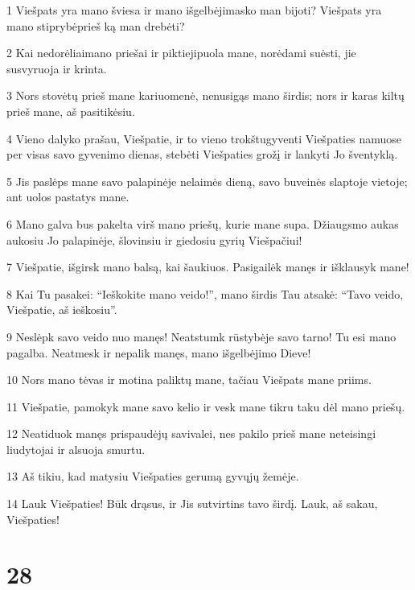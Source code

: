 \par 1 Viešpats yra mano šviesa ir mano išgelbėjimas­ko man bijoti? Viešpats yra mano stiprybė­prieš ką man drebėti? 
\par 2 Kai nedorėliai­mano priešai ir piktieji­puola mane, norėdami suėsti, jie susvyruoja ir krinta. 
\par 3 Nors stovėtų prieš mane kariuomenė, nenusigąs mano širdis; nors ir karas kiltų prieš mane, aš pasitikėsiu. 
\par 4 Vieno dalyko prašau, Viešpatie, ir to vieno trokštu­gyventi Viešpaties namuose per visas savo gyvenimo dienas, stebėti Viešpaties grožį ir lankyti Jo šventyklą. 
\par 5 Jis paslėps mane savo palapinėje nelaimės dieną, savo buveinės slaptoje vietoje; ant uolos pastatys mane. 
\par 6 Mano galva bus pakelta virš mano priešų, kurie mane supa. Džiaugsmo aukas aukosiu Jo palapinėje, šlovinsiu ir giedosiu gyrių Viešpačiui! 
\par 7 Viešpatie, išgirsk mano balsą, kai šaukiuos. Pasigailėk manęs ir išklausyk mane! 
\par 8 Kai Tu pasakei: “Ieškokite mano veido!”, mano širdis Tau atsakė: “Tavo veido, Viešpatie, aš ieškosiu”. 
\par 9 Neslėpk savo veido nuo manęs! Neatstumk rūstybėje savo tarno! Tu esi mano pagalba. Neatmesk ir nepalik manęs, mano išgelbėjimo Dieve! 
\par 10 Nors mano tėvas ir motina paliktų mane, tačiau Viešpats mane priims. 
\par 11 Viešpatie, pamokyk mane savo kelio ir vesk mane tikru taku dėl mano priešų. 
\par 12 Neatiduok manęs prispaudėjų savivalei, nes pakilo prieš mane neteisingi liudytojai ir alsuoja smurtu. 
\par 13 Aš tikiu, kad matysiu Viešpaties gerumą gyvųjų žemėje. 
\par 14 Lauk Viešpaties! Būk drąsus, ir Jis sutvirtins tavo širdį. Lauk, aš sakau, Viešpaties!



\chapter{28}


